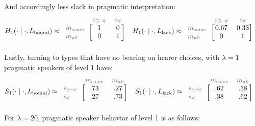 \documentclass[a4paper, 11pt]{article}
\theoremstyle{Satz}
\newcommand{\state}{\ensuremath{s}\xspace}		%
\newcommand{\mystate}[1]{\ensuremath{\state_{\text{#1}}}\xspace} %
\newcommand{\mylang}[1]{\ensuremath{L_{\text{#1}}}\xspace} %
\newcommand{\messg}{\ensuremath{m}\xspace}		%
\newcommand{\mymessg}[1]{\ensuremath{\messg_{\text{#1}}}\xspace} %
\newcommand{\ssome}{\mystate{\ensuremath{\exists\neg\forall}}}
\newcommand{\sall}{\mystate{\ensuremath{\forall}}}
\newcommand{\msome}{\mymessg{some}}
\newcommand{\mall}{\mymessg{all}}
\newcommand{\Lbound}{\mylang{bound}}
\newcommand{\Llack}{\mylang{lack}}
\newcommand{\mygray}[1]{{\textcolor{mygray}{#1}}}
\begin{document}
And accordingly less slack in pragmatic interpretation:
\begin{align*}
  H_1(\cdot \mid \cdot, \Lbound) & \approx \begin{blockarray}{lcc}
    & \mygray{\ssome} & \mygray{\sall} \\
    \begin{block}{l[cc]}
      \mygray{\msome} & 1 & 0 \\
      \mygray{\mall}  & 0 & 1 \\
    \end{block}
  \end{blockarray} &
  H_1(\cdot \mid \cdot, \Llack) & \approx \begin{blockarray}{lcc}
    & \mygray{\ssome} & \mygray{\sall} \\
    \begin{block}{l[cc]}
      \mygray{\msome} & 0.67 & 0.33 \\
      \mygray{\mall}  & 0 & 1 \\
    \end{block}
  \end{blockarray} 
\end{align*}
Lastly, turning to types that have no bearing on hearer choices, with $\lambda = 1$ pragmatic speakers of level 1 have:
\begin{align*}
  S_1(\cdot \mid \cdot, \Lbound) & \approx \begin{blockarray}{lcc}
    & \mygray{\msome} & \mygray{\mall} \\
    \begin{block}{l[cc]}
      \mygray{\ssome} & .73 & .27 \\
      \mygray{\sall}  & .27 & .73 \\
    \end{block}
  \end{blockarray} &
  S_1(\cdot \mid \cdot, \Llack) & \approx \begin{blockarray}{lcc}
    & \mygray{\msome} & \mygray{\mall} \\
    \begin{block}{l[cc]}
      \mygray{\ssome} & .62 & .38 \\
      \mygray{\sall}  & .38 & .62 \\
    \end{block}
  \end{blockarray} 
\end{align*}
For $\lambda = 20$, pragmatic speaker behavior of level 1 is as follows:
\end{document}
